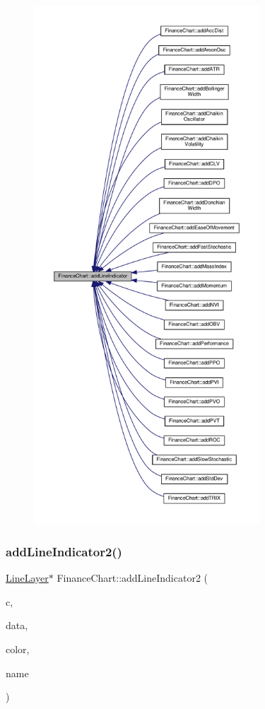 \begin{figure}[H]
\begin{center}
\leavevmode
\includegraphics[height=550pt]{class_finance_chart_a799daf3775d8e100cd771eba230252ff_icgraph}
\end{center}
\end{figure}
\mbox{\label{class_finance_chart_af7000f18368de197ff56bf5dba1f711c}} 
\subsubsection{\texorpdfstring{add\+Line\+Indicator2()}{addLineIndicator2()}}
{\footnotesize\ttfamily \hyperlink{class_line_layer}{Line\+Layer}$\ast$ Finance\+Chart\+::add\+Line\+Indicator2 (\begin{DoxyParamCaption}\item[{\hyperlink{class_x_y_chart}{X\+Y\+Chart} $\ast$}]{c,  }\item[{\hyperlink{class_double_array}{Double\+Array}}]{data,  }\item[{int}]{color,  }\item[{const char $\ast$}]{name }\end{DoxyParamCaption})\hspace{0.3cm}{\ttfamily [inline]}}



